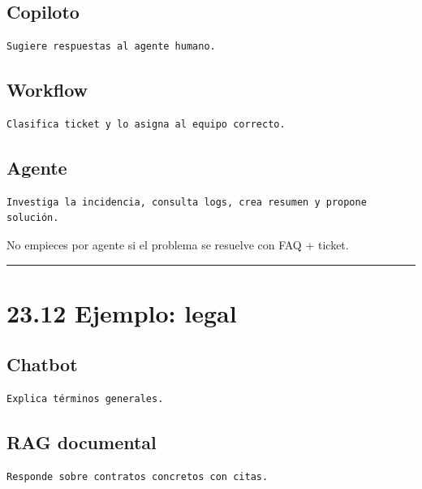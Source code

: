 \subsection{Copiloto}\label{copiloto-2}

\begin{lstlisting}
Sugiere respuestas al agente humano.
\end{lstlisting}

\subsection{Workflow}\label{workflow-1}

\begin{lstlisting}
Clasifica ticket y lo asigna al equipo correcto.
\end{lstlisting}

\subsection{Agente}\label{agente-2}

\begin{lstlisting}
Investiga la incidencia, consulta logs, crea resumen y propone solución.
\end{lstlisting}

No empieces por agente si el problema se resuelve con FAQ + ticket.

\begin{center}\rule{0.5\linewidth}{0.5pt}\end{center}

\section{23.12 Ejemplo: legal}\label{ejemplo-legal}

\subsection{Chatbot}\label{chatbot-3}

\begin{lstlisting}
Explica términos generales.
\end{lstlisting}

\subsection{RAG documental}\label{rag-documental-1}

\begin{lstlisting}
Responde sobre contratos concretos con citas.
\end{lstlisting}

